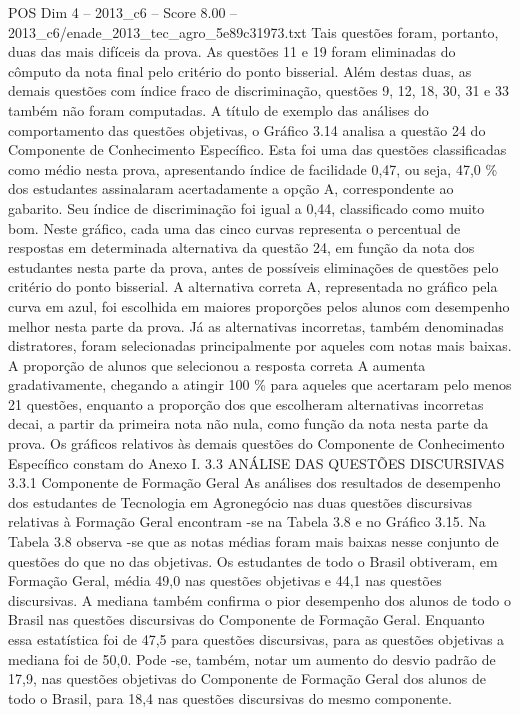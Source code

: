 \begin{textsample}{POS Dim 4 – 2013\_c6 – Score 8.00 – 2013\_c6/enade\_2013\_tec\_agro\_5e89c31973.txt}
Tais questões foram, portanto, duas das mais difíceis da prova.
As questões 11 e 19 foram eliminadas do cômputo da nota final pelo critério do ponto bisserial.
Além destas duas, as demais questões com índice fraco de discriminação, questões 9, 12, 18, 30, 31 e 33 também não foram computadas.
A título de exemplo das análises do comportamento das questões objetivas, o Gráfico 3.14 analisa a questão 24 do Componente de Conhecimento Específico.
Esta foi uma das questões classificadas como médio nesta prova, apresentando índice de facilidade 0,47, ou seja, 47,0 \% dos estudantes assinalaram acertadamente a opção A, correspondente ao gabarito.
Seu índice de discriminação foi igual a 0,44, classificado como muito bom.
Neste gráfico, cada uma das cinco curvas representa o percentual de respostas em determinada alternativa da questão 24, em função da nota dos estudantes nesta parte da prova, antes de possíveis eliminações de questões pelo critério do ponto bisserial.
A alternativa correta A, representada no gráfico pela curva em azul, foi escolhida em maiores proporções pelos alunos com desempenho melhor nesta parte da prova.
Já as alternativas incorretas, também denominadas distratores, foram selecionadas principalmente por aqueles com notas mais baixas.
A proporção de alunos que selecionou a resposta correta A aumenta gradativamente, chegando a atingir 100 \% para aqueles que acertaram pelo menos 21 questões, enquanto a proporção dos que escolheram alternativas incorretas decai, a partir da primeira nota não nula, como função da nota nesta parte da prova.
Os gráficos relativos às demais questões do Componente de Conhecimento Específico constam do Anexo I. 3.3 ANÁLISE DAS QUESTÕES DISCURSIVAS 3.3.1 Componente de Formação Geral As análises dos resultados de desempenho dos estudantes de Tecnologia em Agronegócio nas duas questões discursivas relativas à Formação Geral encontram -se na Tabela 3.8 e no Gráfico 3.15.
Na Tabela 3.8 observa -se que as notas médias foram mais baixas nesse conjunto de questões do que no das objetivas.
Os estudantes de todo o Brasil obtiveram, em Formação Geral, média 49,0 nas questões objetivas e 44,1 nas questões discursivas.
A mediana também confirma o pior desempenho dos alunos de todo o Brasil nas questões discursivas do Componente de Formação Geral.
Enquanto essa estatística foi de 47,5 para questões discursivas, para as questões objetivas a mediana foi de 50,0.
Pode -se, também, notar um aumento do desvio padrão de 17,9, nas questões objetivas do Componente de Formação Geral dos alunos de todo o Brasil, para 18,4 nas questões discursivas do mesmo componente.

\end{textsample}
